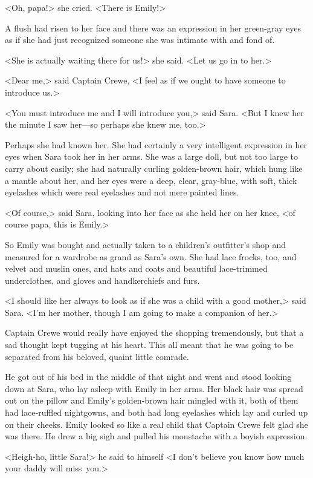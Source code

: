 <Oh, papa!> she cried. <There is Emily!>

A flush had risen to her face and there was an expression in her green-gray eyes as if she had just recognized someone she was intimate with and fond of.

<She is actually waiting there for us!> she said. <Let us go in to her.>

<Dear me,> said Captain Crewe, <I feel as if we ought to have someone to introduce us.>

<You must introduce me and I will introduce you,> said Sara. <But I knew her the minute I saw her—so perhaps she knew me, too.>

Perhaps she had known her. She had certainly a very intelligent expression in her eyes when Sara took her in her arms. She was a large doll, but not too large to carry about easily; she had naturally curling golden-brown hair, which hung like a mantle about her, and her eyes were a deep, clear, gray-blue, with soft, thick eyelashes which were real eyelashes and not mere painted lines.

<Of course,> said Sara, looking into her face as she held her on her knee, <of course papa, this is Emily.>

So Emily was bought and actually taken to a children's outfitter's shop and measured for a wardrobe as grand as Sara's own. She had lace frocks, too, and velvet and muslin ones, and hats and coats and beautiful lace-trimmed underclothes, and gloves and handkerchiefs and furs.

<I should like her always to look as if she was a child with a good mother,> said Sara. <I'm her mother, though I am going to make a companion of her.>

Captain Crewe would really have enjoyed the shopping tremendously, but that a sad thought kept tugging at his heart. This all meant that he was going to be separated from his beloved, quaint little comrade.

He got out of his bed in the middle of that night and went and stood looking down at Sara, who lay asleep with Emily in her arms. Her black hair was spread out on the pillow and Emily's golden-brown hair mingled with it, both of them had lace-ruffled nightgowns, and both had long eyelashes which lay and curled up on their cheeks. Emily looked so like a real child that Captain Crewe felt glad she was there. He drew a big sigh and pulled his moustache with a boyish expression.

<Heigh-ho, little Sara!> he said to himself <I don't believe you know how much your daddy will miss~you.>

